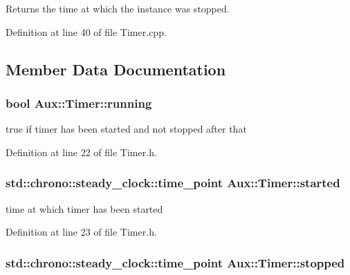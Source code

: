 Returns the time at which the instance was stopped. 



Definition at line 40 of file Timer.\-cpp.



\subsection{Member Data Documentation}
\hypertarget{class_aux_1_1_timer_a5a85ed37ed9e2f0eb07e35a465094b9f}{
\subsubsection[{running}]{\setlength{\rightskip}{0pt plus 5cm}bool Aux\-::\-Timer\-::running\hspace{0.3cm}{\ttfamily [protected]}}}\label{class_aux_1_1_timer_a5a85ed37ed9e2f0eb07e35a465094b9f}


true if timer has been started and not stopped after that 



Definition at line 22 of file Timer.\-h.

\hypertarget{class_aux_1_1_timer_a2fde73af550d464ac12d62eb53c3a976}{
\subsubsection[{started}]{\setlength{\rightskip}{0pt plus 5cm}std\-::chrono\-::steady\-\_\-clock\-::time\-\_\-point Aux\-::\-Timer\-::started\hspace{0.3cm}{\ttfamily [protected]}}}\label{class_aux_1_1_timer_a2fde73af550d464ac12d62eb53c3a976}


time at which timer has been started 



Definition at line 23 of file Timer.\-h.

\hypertarget{class_aux_1_1_timer_a2b2db52da1cb51c6940597173133d910}{
\subsubsection[{stopped}]{\setlength{\rightskip}{0pt plus 5cm}std\-::chrono\-::steady\-\_\-clock\-::time\-\_\-point Aux\-::\-Timer\-::stopped\hspace{0.3cm}{\ttfamily [protected]}}}\label{class_aux_1_1_timer_a2b2db52da1cb51c6940597173133d910}


